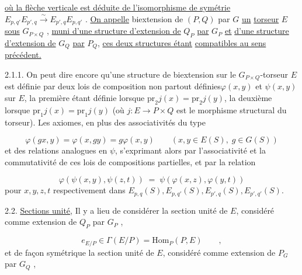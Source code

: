 \underline{où la flèche verticale est déduite de l'isomorphisme de symétrie}
$E_{p,q'}E_{p',q} \overset{\sim}{\longrightarrow} E_{p',q}E_{p,q'}$ . \underline{On appelle} biextension de $(P,Q)$ par $G$ \underline{un}
\underline{torseur} $E$ \underline{sous} $G_{P\times Q}$ , \underline{muni d'une structure d'extension de} $Q_P$ \underline{par} $G_P$ \underline{et}
\underline{d'une structure d'extension de} $G_Q$ \underline{par} $P_Q$, \underline{ces deux structures étant}
\underline{compatibles au sens précédent.}



2.1.1.  On peut dire encore qu'une structure de biextension sur le
$G_{P\times Q}$-torseur $E$ est définie par deux lois de composition non partout définies$\varphi(x,y)$ et $\psi(x,y)$ sur $E$, la première étant définie lorsque
$\mathrm{pr}_2 j(x) = \mathrm{pr}_2 j(y)$, la deuxième lorsque $\mathrm{pr}_1 j(x) = \mathrm{pr}_1 j(y)$ (où $j : E \to P\times Q$
est le morphisme structural du torseur). Les axiomes, en plus des associativités du type

\begin{equation}\tag{2.1.1.1}
\varphi(gx,y) = \varphi(x,gy) = g\varphi(x,y) \qquad (x,y \in E(S), \; g \in G(S))
\end{equation}
et des relations analogues en $\psi$, s'exprimant alors par l'associativité
et la commutativité de ces lois de compositions partielles, et par la
relation

\begin{equation}\tag{2.1.1.2}
\varphi(\psi(x,y),\psi(z,t)) \;=\; \psi(\varphi(x,z),\varphi(y,t))
\end{equation}
pour $x,y,z,t$ respectivement dans $E_{p,q}(S),E_{p,q'}(S),E_{p',q}(S),E_{p',q'}(S)$.

2.2.  \underline{Sections unité}, Il y a lieu de considérer la section unité de $E$,
considéré comme extension de $Q_P$ par $G_P$ ,

\begin{equation}\tag{2.2.1}
e_{E/P} \in \Gamma(E/P) = \mathrm{Hom}_P(P,E) \qquad ,
\end{equation}
et de façon symétrique la section unité de $E$, considéré comme extension
de $P_G$ par $G_Q$ ,

